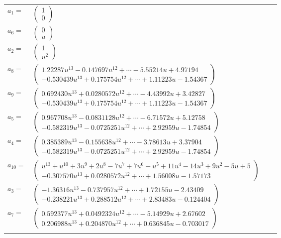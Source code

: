 \documentclass[1p]{elsarticle_modified}
\theoremstyle{definition}
\begin{document}
\begin{tabular}{m{7pt} m{180pt} m{7pt} m{180pt} }
\flushright $a_{1}=$&$\begin{pmatrix}1\\0\end{pmatrix}$ \\
\flushright $a_{6}=$&$\begin{pmatrix}0\\u\end{pmatrix}$ \\
\flushright $a_{2}=$&$\begin{pmatrix}1\\u^2\end{pmatrix}$ \\
\flushright $a_{8}=$&$\begin{pmatrix}1.22287 u^{13}-0.147697 u^{12}+\cdots-5.55214 u+4.97194\\-0.530439 u^{13}+0.175754 u^{12}+\cdots+1.11223 u-1.54367\end{pmatrix}$ \\
\flushright $a_{9}=$&$\begin{pmatrix}0.692430 u^{13}+0.0280572 u^{12}+\cdots-4.43992 u+3.42827\\-0.530439 u^{13}+0.175754 u^{12}+\cdots+1.11223 u-1.54367\end{pmatrix}$ \\
\flushright $a_{5}=$&$\begin{pmatrix}0.967708 u^{13}-0.0831128 u^{12}+\cdots-6.71572 u+5.12758\\-0.582319 u^{13}-0.0725251 u^{12}+\cdots+2.92959 u-1.74854\end{pmatrix}$ \\
\flushright $a_{4}=$&$\begin{pmatrix}0.385389 u^{13}-0.155638 u^{12}+\cdots-3.78613 u+3.37904\\-0.582319 u^{13}-0.0725251 u^{12}+\cdots+2.92959 u-1.74854\end{pmatrix}$ \\
\flushright $a_{10}=$&$\begin{pmatrix}u^{13}+u^{10}+3 u^9+2 u^8-7 u^7+7 u^6- u^5+11 u^4-14 u^3+9 u^2-5 u+5\\-0.307570 u^{13}+0.0280572 u^{12}+\cdots+1.56008 u-1.57173\end{pmatrix}$ \\
\flushright $a_{3}=$&$\begin{pmatrix}-1.36316 u^{13}-0.737957 u^{12}+\cdots+1.72155 u-2.43409\\-0.238221 u^{13}+0.288512 u^{12}+\cdots+2.83483 u-0.124404\end{pmatrix}$ \\
\flushright $a_{7}=$&$\begin{pmatrix}0.592377 u^{13}+0.0492324 u^{12}+\cdots-5.14929 u+2.67602\\0.206988 u^{13}+0.204870 u^{12}+\cdots+0.636845 u-0.703017\end{pmatrix}$\\&\end{tabular}
\end{document}
